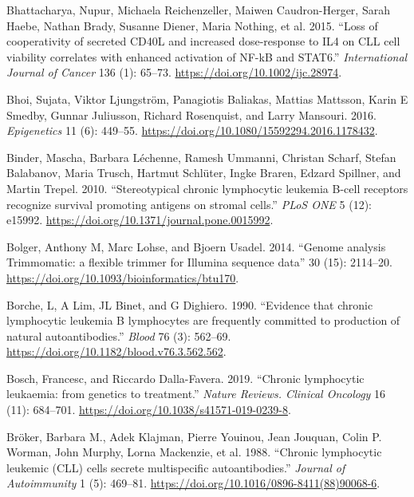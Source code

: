 \documentclass[11pt, a4paper, twosided]{book}
\newenvironment{CSLReferences}%
  {}%
  {\par}
\begin{document}
\begin{CSLReferences}{1}{0}
\leavevmode{}%
Bhattacharya, Nupur, Michaela Reichenzeller, Maiwen Caudron-Herger, Sarah Haebe, Nathan Brady, Susanne Diener, Maria Nothing, et al. 2015. {``{Loss of cooperativity of secreted CD40L and increased dose-response to IL4 on CLL cell viability correlates with enhanced activation of NF-kB and STAT6}.''} \emph{International Journal of Cancer} 136 (1): 65--73. \url{https://doi.org/10.1002/ijc.28974}.

\leavevmode{}%
Bhoi, Sujata, Viktor Ljungström, Panagiotis Baliakas, Mattias Mattsson, Karin E Smedby, Gunnar Juliusson, Richard Rosenquist, and Larry Mansouri. 2016. \emph{Epigenetics} 11 (6): 449--55. \url{https://doi.org/10.1080/15592294.2016.1178432}.

\leavevmode{}%
Binder, Mascha, Barbara Léchenne, Ramesh Ummanni, Christan Scharf, Stefan Balabanov, Maria Trusch, Hartmut Schlüter, Ingke Braren, Edzard Spillner, and Martin Trepel. 2010. {``{Stereotypical chronic lymphocytic leukemia B-cell receptors recognize survival promoting antigens on stromal cells}.''} \emph{PLoS ONE} 5 (12): e15992. \url{https://doi.org/10.1371/journal.pone.0015992}.

\leavevmode{}%
Bolger, Anthony M, Marc Lohse, and Bjoern Usadel. 2014. {``{Genome analysis Trimmomatic: a flexible trimmer for Illumina sequence data}''} 30 (15): 2114--20. \url{https://doi.org/10.1093/bioinformatics/btu170}.

\leavevmode{}%
Borche, L, A Lim, JL Binet, and G Dighiero. 1990. {``{Evidence that chronic lymphocytic leukemia B lymphocytes are frequently committed to production of natural autoantibodies}.''} \emph{Blood} 76 (3): 562--69. \url{https://doi.org/10.1182/blood.v76.3.562.562}.

\leavevmode{}%
Bosch, Francesc, and Riccardo Dalla-Favera. 2019. {``{Chronic lymphocytic leukaemia: from genetics to treatment.}''} \emph{Nature Reviews. Clinical Oncology} 16 (11): 684--701. \url{https://doi.org/10.1038/s41571-019-0239-8}.

\leavevmode{}%
Bröker, Barbara M., Adek Klajman, Pierre Youinou, Jean Jouquan, Colin P. Worman, John Murphy, Lorna Mackenzie, et al. 1988. {``{Chronic lymphocytic leukemic (CLL) cells secrete multispecific autoantibodies}.''} \emph{Journal of Autoimmunity} 1 (5): 469--81. \url{https://doi.org/10.1016/0896-8411(88)90068-6}.


\end{CSLReferences}
\end{document}
